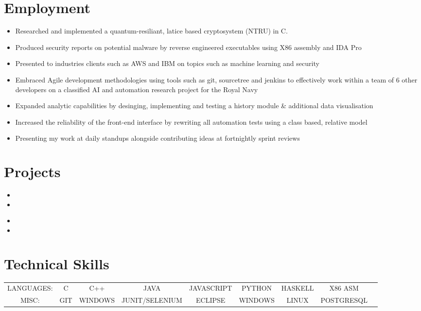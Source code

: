 \documentclass{cvclass}
\begin{document}
\section{\textbf{Employment}}
\begin{itemize}
\itemsep0em
\item Researched and implemented a quantum-resiliant, latice based cryptosystem (NTRU) in C.
\item Produced security reports on potential malware by reverse engineered executables using X86 assembly and IDA Pro
\item Presented to industries clients such as AWS and IBM on topics such as machine learning and security
\end{itemize}
\begin{itemize}
\itemsep0em 
\item Embraced Agile development methodologies using tools such as git, sourcetree and jenkins  to effectively work within a team of 6 other developers on a classified AI and automation research project for the Royal Navy
\item Expanded analytic capabilities by desinging, implementing and testing a history module \& additional data visualisation
\item Increased the reliability of the front-end interface by rewriting all automation tests using a class based, relative model
\item Presenting my work at daily standups alongside contributing ideas at fortnightly sprint reviews
\end{itemize}

\section{\textbf{Projects}}
\begin{itemize}
\itemsep0em 
\item
\item
\end{itemize}
\begin{itemize}
\itemsep0em 
\item
\item
\end{itemize}

\section{Technical Skills}
\begin{tabular}{ c c c c c c c c c }
  LANGUAGES: & C & C++ & JAVA & JAVASCRIPT & PYTHON & HASKELL & X86 ASM\\
  MISC: & GIT & WINDOWS & JUNIT/SELENIUM & ECLIPSE & WINDOWS & LINUX & POSTGRESQL
\end{tabular}\newline
\end{document}
